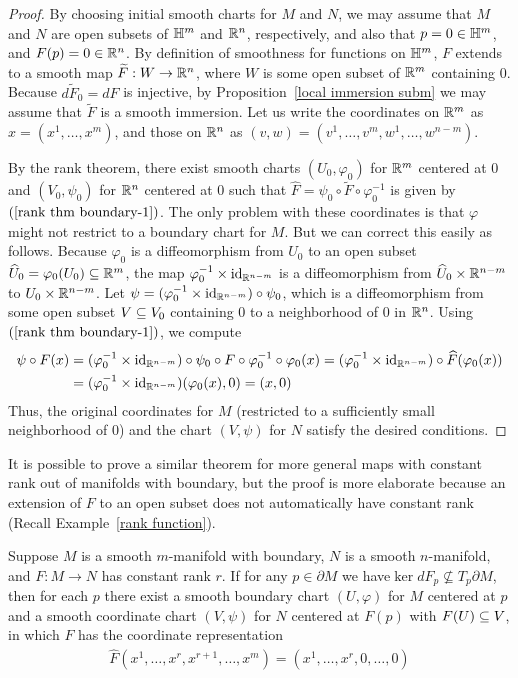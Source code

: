 \begin{proof}
By choosing initial smooth charts for $M$ and $N$, we may assume that $M$ and $N$ are open subsets of $\mathbb{H}^m$ and $\mathbb{R}^n$, respectively, and also that $p=0\in\mathbb{H}^m$, and $F(p)=0\in\mathbb{R}^n$. By definition of smoothness for functions on $\mathbb{H}^m$, $F$ extends to a smooth map $\widetilde{F}:W\to\mathbb{R}^n$, where $W$ is some open subset of $\mathbb{R}^m$ containing $0$. Because $d\widetilde{F}_0=dF$ is injective, by Proposition~\ref{local immersion subm} we may assume that $\widetilde{F}$ is a smooth immersion. Let us write the coordinates on $\mathbb{R}^m$ as $x=(x^1,\dots,x^m)$, and those on $\mathbb{R}^n$ as $(v,w)=(v^1,\dots,v^m,w^1,\dots,w^{n-m})$.\par
By the rank theorem, there exist smooth charts $(U_0,\varphi_0)$ for $\mathbb{R}^m$ centered at $0$ and $(V_0,\psi_0)$ for $\mathbb{R}^n$ centered at $0$ such that $\widehat{F}=\psi_0\circ\widetilde{F}\circ\varphi^{-1}_0$ is given by $(\ref{rank thm boundary-1})$. The only problem with these coordinates is that $\varphi$ might not restrict to a boundary chart for $M$. But we can correct this easily as follows. Because $\varphi_0$ is a diffeomorphism from $U_0$ to an open subset $\widehat{U}_0=\varphi_0(U_0)\subseteq\mathbb{R}^m$, the map $\varphi_0^{-1}\times\mathrm{id}_{\mathbb{R}^{n-m}}$ is a diffeomorphism from $\widehat{U}_0\times\mathbb{R}^{n-m}$ to $U_0\times\mathbb{R}^{n-m}$. Let $\psi=(\varphi_0^{-1}\times\mathrm{id}_{\mathbb{R}^{n-m}})\circ\psi_0$, which is a diffeomorphism from some open subset $V\subseteq V_0$ containing $0$ to a neighborhood
of $0$ in $\mathbb{R}^n$. Using $(\ref{rank thm boundary-1})$, we compute
\begin{align*}
\psi\circ F(x)&=(\varphi_0^{-1}\times\mathrm{id}_{\mathbb{R}^{n-m}})\circ\psi_0\circ F\circ\varphi_0^{-1}\circ\varphi_0(x)=(\varphi_0^{-1}\times\mathrm{id}_{\mathbb{R}^{n-m}})\circ\widehat{F}(\varphi_0(x))\\
&=(\varphi_0^{-1}\times\mathrm{id}_{\mathbb{R}^{n-m}})(\varphi_0(x),0)=(x,0)
\end{align*}
Thus, the original coordinates for $M$ (restricted to a sufficiently small neighborhood of $0$) and the chart $(V,\psi)$ for $N$ satisfy the desired conditions.
\end{proof}
It is possible to prove a similar theorem for more general maps with constant rank out of manifolds with boundary, but the proof is more elaborate because an extension of $F$ to an open subset does not automatically have constant rank (Recall Example~\ref{rank function}).
\begin{corollary}\label{rank thm boundary}
Suppose $M$ is a smooth $m$-manifold with boundary, $N$ is a smooth $n$-manifold, and
$F:M\to N$ has constant rank $r$. If for any $p\in\partial M$ we have$\ker dF_p\nsubseteq T_p\partial M$, then for each $p$ there exist a smooth boundary chart $(U,\varphi)$ for $M$ centered at $p$ and a smooth coordinate chart $(V,\psi)$ for $N$ centered at $F(p)$ with $F(U)\subseteq V$, in which $F$ has the coordinate representation
\begin{align}\label{rank thm boundary-2}
\widehat{F}(x^1,\dots,x^r,x^{r+1},\dots,x^m)=(x^1,\dots,x^r,0,\dots,0)
\end{align}
\end{corollary}
